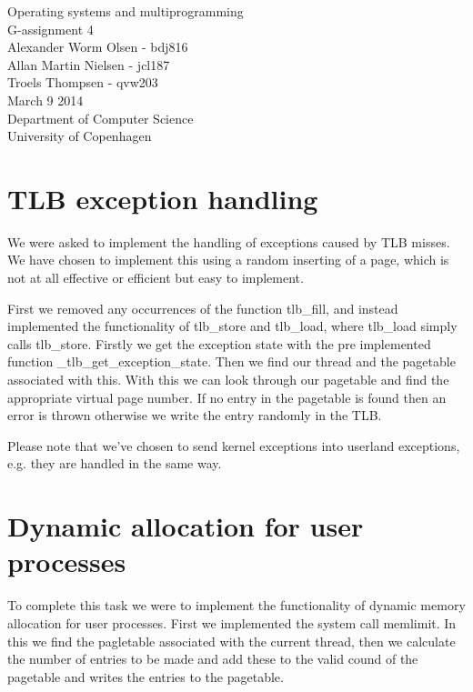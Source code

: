 \documentclass[12pt,a4paper,danish]{article}
\begin{document}
\begin{titlepage}
    \vspace*{\fill}
    \begin{center}
      {\Huge Operating systems and multiprogramming}\\[0.7cm]
      {\huge G-assignment 4}\\[0.7cm]
      {\large Alexander Worm Olsen - bdj816}\\[0.4cm]
      {\large Allan Martin Nielsen - jcl187}\\[0.4cm]
      {\large Troels Thompsen - qvw203}\\[0.4cm]
      {\small March 9 2014}\\[0.3cm] 
      {\small Department of Computer Science}\\
      {\small University of Copenhagen}
    \end{center}
    \vspace*{\fill}
\end{titlepage}

\section{TLB exception handling}
We were asked to implement the handling of exceptions caused by TLB misses. We have chosen to implement this using a random inserting of a page, which is not at all effective or efficient but easy to implement.

First we removed any occurrences of the function tlb\_fill, and instead implemented the functionality of tlb\_store and tlb\_load, where tlb\_load simply calls tlb\_store. Firstly we get the exception state with the pre implemented function \_tlb\_get\_exception\_state. Then we find our thread and the pagetable associated with this. With this we can look through our pagetable and find the appropriate virtual page number. If no entry in the pagetable is found then an error is thrown otherwise we write the entry randomly in the TLB.

Please note that we've chosen to send kernel exceptions into userland exceptions, e.g. they are handled in the same way. 

\section{Dynamic allocation for user processes}
To complete this task we were to implement the functionality of dynamic memory allocation for user processes. First we implemented the system call memlimit. In this we find the pagletable associated with the current thread, then we calculate the number of entries to be made and add these to the valid cound of the pagetable and writes the entries to the pagetable.
\end{document}
